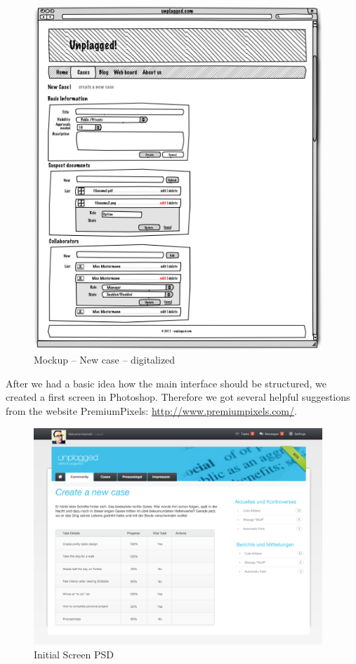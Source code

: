 \begin{figure}[htbp]
  \centering
    \includegraphics[width=0.97\textwidth , bb = 0 250 490 560,clip]{mockups/1_new_case.png}
  \caption{Mockup -- New case -- digitalized}
  \label{fig:1newCaseMockup}
\end{figure}


After we had a basic idea how the main interface should be structured, we created a first screen in Photoshop. Therefore we got several helpful suggestions from the website PremiumPixels: \url{http://www.premiumpixels.com/}.

\begin{figure}[htbp]
  \centering
    \includegraphics[width=0.97\textwidth]{images/init-psd.png}
  \caption{Initial Screen PSD}
  \label{fig:initialScreenPsd}
\end{figure}

